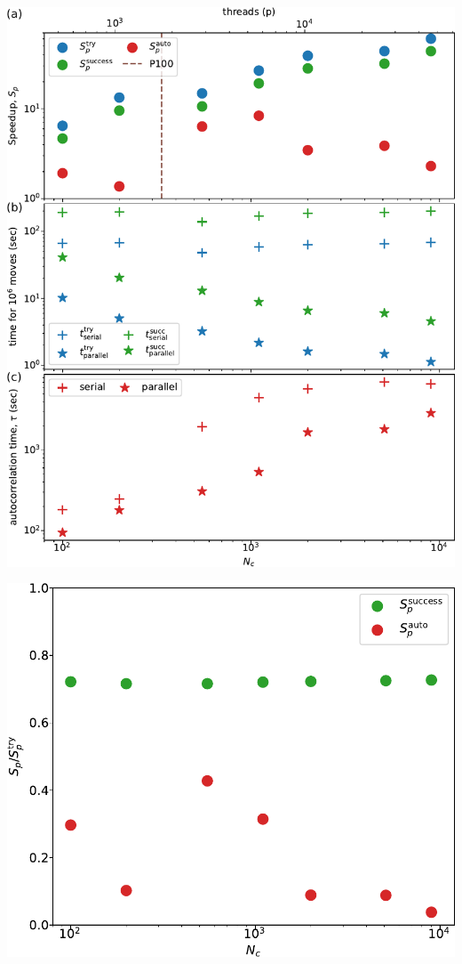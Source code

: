 \documentclass[aspectratio=169]{beamer}
\begin{document}
\begin{frame}[c]{}

  \centering
  \includegraphics[height=\textheight]{../figures/ch3_gpu/fig-speedup/fig-speedup.pdf}

\end{frame}

\begin{frame}[c]{}

  \centering
  \includegraphics[height=\textheight]{../figures/ch3_gpu/fig-speedup_ratios/fig-speedup.pdf}

\end{frame}
\end{document}
